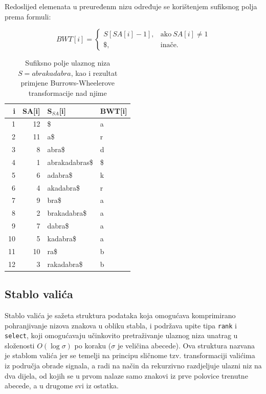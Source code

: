 \documentclass[a4paper,12pt]{article}
\begin{document}
Redoslijed elemenata u preuređenm nizu određuje se korištenjem sufiksnog polja prema formuli:

$$
BWT[i]=
\begin{cases}
S[SA[i]-1], & \text{ako} \  SA[i]\neq 1\\ 
\$, & \text{inače}.
\end{cases}
$$

\begin{table}[h!]
	\caption{Sufiksno polje ulaznog niza $S = abrakadabra$, kao i rezultat primjene Burrows-Wheelerove transformacije nad njime}
	\label{tablePrimjer2}
	\begin{center}
		\begin{tabular}{rrll}
			\toprule
			i & SA[i] & S$_{SA}$[i] & BWT[i] \\
			\midrule
			1 & 12 & \$ & a\\
			2 & 11 &  a\$ & r \\
			3 & 8 & abra\$ & d \\
			4 & 1 & abrakadabras\$ & \$ \\
			5 & 6 & adabra\$ & k \\
			6 & 4 & akadabra\$ & r \\
			7 & 9 & bra\$ & a\\
			8 & 2 & brakadabra\$ & a\\
			9 & 7 & dabra\$ & a \\
			10 & 5 & kadabra\$ & a\\
			11 & 10 & ra\$ & b \\
			12 & 3 & rakadabra\$ & b\\
			\bottomrule
		\end{tabular}
	\end{center}
\end{table} 

\newpage

\subsection{Stablo valića}
Stablo valića je sažeta struktura podataka koja omogućava komprimirano pohranjivanje nizova znakova u obliku stabla, i podržava upite tipa \texttt{rank} i \texttt{select}, koji omogućavaju učinkovito pretraživanje ulaznog niza unatrag u složenosti $O(\log\sigma)$ po koraku ($\sigma$ je veličina abecede). Ova struktura nazvana je stablom valića jer se temelji na principu sličnome tzv. transformaciji valićima iz područja obrade signala, a radi na način da rekurzivno razdjeljuje ulazni niz na dva dijela, od kojih se u prvom nalaze samo znakovi iz prve polovice trenutne abecede, a u drugome svi iz ostatka.
\end{document}

